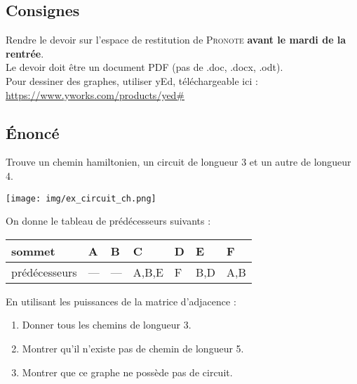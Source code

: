 \documentclass[a4paper,12pt]{book}
\begin{document}

\subsection*{Consignes}

Rendre le devoir sur l'espace de restitution de \textsc{Pronote} \textbf{avant le mardi de la rentrée}.\\
Le devoir doit être un document PDF (pas de .doc, .docx, .odt).\\
Pour dessiner des graphes, utiliser yEd, téléchargeable ici :\\ \url{https://www.yworks.com/products/yed#}

\subsection*{\'Enoncé}


\begin{exercice}[ (6 du cours)]
Trouve un chemin hamiltonien, un circuit de longueur 3 et un autre de longueur 4.
\begin{center}
\texttt{[image: img/ex\_circuit\_ch.png]}
\end{center}
\end{exercice}



\begin{exercice}[ (7 du cours)]
On donne le tableau de prédécesseurs suivants :
\begin{center}
\begin{tabular}{|l|>{\centering\arraybackslash}p{1cm}|>{\centering\arraybackslash}p{1cm}|>{\centering\arraybackslash}p{1cm}|>{\centering\arraybackslash}p{1cm}|>{\centering\arraybackslash}p{1cm}|>{\centering\arraybackslash}p{1cm}|}
\hline
sommet		 	& A 	& B 	& C 	& D 	& E 	& F\\
\hline
prédécesseurs 	& --- 	& --- 	& A,B,E & F 	& B,D   & A,B\\
\hline
\end{tabular}
\end{center}
En utilisant les puissances de la matrice d'adjacence :
\begin{enumerate}[--]
	\item 	Donner tous les chemins de longueur 3.
	\item 	Montrer qu'il n'existe pas de chemin de longueur 5.
	\item 	Montrer que ce graphe ne possède pas de circuit.
\end{enumerate}
\end{exercice}
\end{document}
